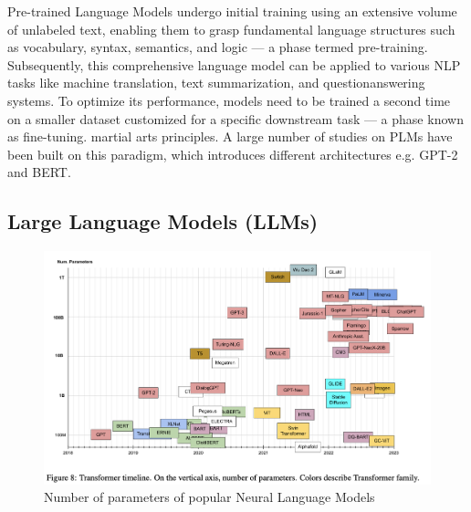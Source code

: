 Pre-trained Language Models undergo initial training using an extensive volume of unlabeled text, enabling them to grasp fundamental language structures such as vocabulary, syntax, semantics, and logic — a phase termed pre-training. Subsequently, this comprehensive language model can be applied to various NLP tasks like machine translation, text summarization, and questionanswering systems. To optimize its performance, models need to be trained a second time on a smaller dataset customized for a specific downstream task — a phase known as fine-tuning. martial arts principles. A large number of studies on PLMs have been built on this paradigm, which introduces different architectures e.g. GPT-2 and BERT.

\subsection{Large Language Models (LLMs)}

\begin{figure}[h]
    \centering
    \includegraphics[width=0.8\linewidth]{img/chap04/numparam-transformer.png}
    \caption{Number of parameters of popular Neural Language Models}
    \label{fig:numparam-trans}
\end{figure}

